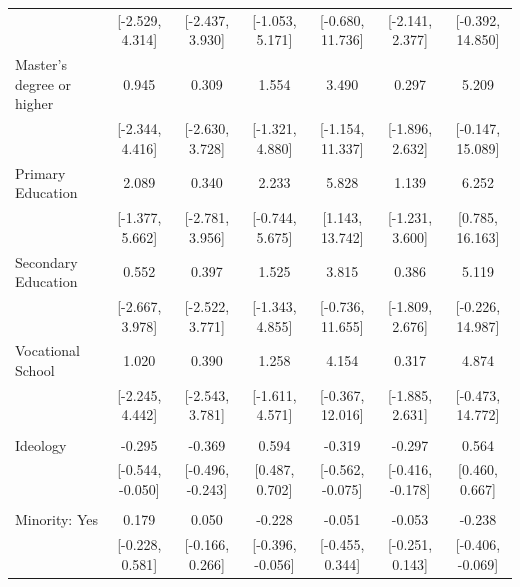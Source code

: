 \documentclass[
  10,
  letterpaper,
  DIV=11,
  numbers=noendperiod]{scrartcl}
\begin{document}
\begin{table}
\begin{tabular}[t]{lcccccc}
\hspace{1em} & {}[-2.529, 4.314] & {}[-2.437, 3.930] & {}[-1.053, 5.171] & {}[-0.680, 11.736] & {}[-2.141, 2.377] & {}[-0.392, 14.850]\\
\hspace{1em}Master's degree or higher & 0.945 & 0.309 & 1.554 & 3.490 & 0.297 & 5.209\\
\hspace{1em} & {}[-2.344, 4.416] & {}[-2.630, 3.728] & {}[-1.321, 4.880] & {}[-1.154, 11.337] & {}[-1.896, 2.632] & {}[-0.147, 15.089]\\
\hspace{1em}Primary Education & 2.089 & 0.340 & 2.233 & 5.828 & 1.139 & 6.252\\
\hspace{1em} & {}[-1.377, 5.662] & {}[-2.781, 3.956] & {}[-0.744, 5.675] & {}[1.143, 13.742] & {}[-1.231, 3.600] & {}[0.785, 16.163]\\
\hspace{1em}Secondary Education & 0.552 & 0.397 & 1.525 & 3.815 & 0.386 & 5.119\\
\hspace{1em} & {}[-2.667, 3.978] & {}[-2.522, 3.771] & {}[-1.343, 4.855] & {}[-0.736, 11.655] & {}[-1.809, 2.676] & {}[-0.226, 14.987]\\
\hspace{1em}Vocational School & 1.020 & 0.390 & 1.258 & 4.154 & 0.317 & 4.874\\
\hspace{1em} & {}[-2.245, 4.442] & {}[-2.543, 3.781] & {}[-1.611, 4.571] & {}[-0.367, 12.016] & {}[-1.885, 2.631] & {}[-0.473, 14.772]\\
\addlinespace[0.3em]
\multicolumn{7}{l}{\cellcolor[HTML]{3498DB}{\textbf{Ideology}}}\\
\hspace{1em}Ideology & -0.295 & -0.369 & 0.594 & -0.319 & -0.297 & 0.564\\
\hspace{1em} & {}[-0.544, -0.050] & {}[-0.496, -0.243] & {}[0.487, 0.702] & {}[-0.562, -0.075] & {}[-0.416, -0.178] & {}[0.460, 0.667]\\
\addlinespace[0.3em]
\multicolumn{7}{l}{\cellcolor[HTML]{3498DB}{\textbf{Minority}}}\\
\hspace{1em}Minority: Yes & 0.179 & 0.050 & -0.228 & -0.051 & -0.053 & -0.238\\
\hspace{1em} & {}[-0.228, 0.581] & {}[-0.166, 0.266] & {}[-0.396, -0.056] & {}[-0.455, 0.344] & {}[-0.251, 0.143] & {}[-0.406, -0.069]\\

\end{tabular}
\end{table}
\end{document}
